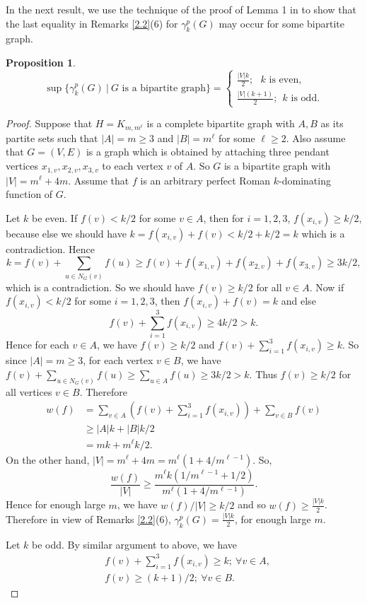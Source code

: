 \documentclass[12pt]{amsart}
\newtheorem{proposition}[theorem]{Proposition}
\begin{document}
In the next result, we use the technique of the proof of Lemma 1 in \cite{perfect} to show that the last equality in Remarks \ref{2.2}(6) for $\gamma_k^p(G)$ may occur for some bipartite graph.
\begin{proposition}
$$\sup \{\gamma_k^p(G) \ | \ G \text{ is a bipartite graph} \} =
\left\lbrace\begin{array}{l}
\frac{|V|k}{2}; \ \ \ k \text{ is even}, \\ 
\frac{|V|(k+1)}{2}; \ \ k \text{ is odd}.
\end{array}\right. $$
\end{proposition}
\begin{proof}
Suppose that $H=K_{m,m^\ell}$ is a complete bipartite graph with $A, B$ as its partite sets such that $|A|=m\geq 3$ and $|B|=m^\ell$ for some $\ell\geq 2$. Also assume that $G=(V,E)$ is a graph which is obtained by attaching three pendant vertices $x_{1,v}, x_{2,v}, x_{3,v}$ to each vertex $v$ of $A$. So $G$ is a bipartite graph with $|V|=m^\ell+4m$. Assume that $f$ is an arbitrary perfect Roman $k$-dominating function of $G$.

 Let $k$ be even. If $f(v)<k/2$ for some $v\in A$, then for $i=1, 2, 3$,  $f(x_{i,v})\geq k/2$, because else we should have $k=f(x_{i,v})+f(v)<k/2+k/2=k$ which is a contradiction. Hence 
$$k=f(v)+\sum_{u\in N_G(v)}f(u)\geq f(v)+f(x_{1,v})+f(x_{2,v})+f(x_{3,v})\geq 3k/2,$$
which is a contradiction. So we should have $f(v)\geq k/2$ for all $v\in A$. Now if $f(x_{i,v})<k/2$ for some $i=1, 2, 3$, then $f(x_{i,v})+f(v)=k$ and else $$f(v)+\sum_{i=1}^3f(x_{i,v})\geq 4k/2>k.$$
Hence for each $v\in A$, we have $f(v)\geq k/2$ and  $f(v)+\sum_{i=1}^3f(x_{i,v})\geq k$. So since 
$|A|=m\geq 3$, for each vertex $v\in B$, we have $f(v)+\sum_{u\in N_G(v)}f(u)\geq \sum_{u\in A}f(u)\geq 3k/2>k$. Thus $f(v)\geq k/2$ for all vertices $v\in B$. Therefore
\begin{align*}
w(f)&=\sum_{v\in A}(f(v)+\sum_{i=1}^3f(x_{i,v}))+\sum_{v\in B}f(v)\\
&\geq |A|k+|B|k/2\\
&= mk+m^\ell k/2.
\end{align*}
On the other hand, $|V|=m^\ell +4m=m^\ell(1+4/m^{\ell -1})$. So, 
$$\frac{w(f)}{|V|}\geq \frac{m^\ell k(1/m^{\ell -1}+1/2)}{m^\ell(1+4/m^{\ell -1})}.$$
Hence for enough large $m$, we have $w(f)/|V|\geq k/2$ and so $w(f)\geq \frac{|V|k}{2}$. Therefore in view of Remarks \ref{2.2}(6), $\gamma_k^p(G)=\frac{|V|k}{2}$, for enough large $m$.

 Let $k$ be odd. By similar argument to above, we have
 \begin{align*}
 &f(v)+\sum_{i=1}^3f(x_{i,v})\geq k; \ \forall v\in A,\\
 &f(v)\geq (k+1)/2; \ \forall v\in B.
 \end{align*}
 

\end{proof}
\end{document}
